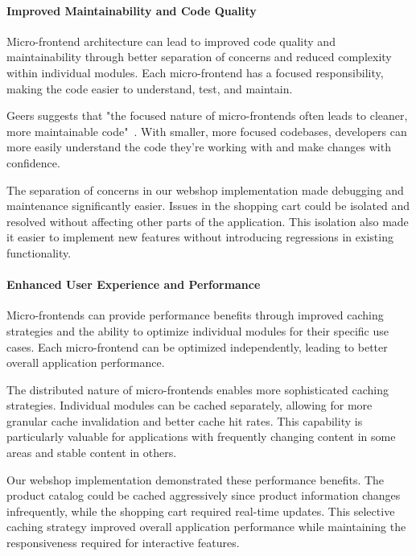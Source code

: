 \documentclass[12pt,a4paper]{report}
\begin{document}
\paragraph{Improved Maintainability and Code Quality}

Micro-frontend architecture can lead to improved code quality and maintainability through better separation of concerns and reduced complexity within individual modules. Each micro-frontend has a focused responsibility, making the code easier to understand, test, and maintain.

Geers suggests that "the focused nature of micro-frontends often leads to cleaner, more maintainable code"~\cite{geers2019microfrontends}. With smaller, more focused codebases, developers can more easily understand the code they're working with and make changes with confidence.

The separation of concerns in our webshop implementation made debugging and maintenance significantly easier. Issues in the shopping cart could be isolated and resolved without affecting other parts of the application. This isolation also made it easier to implement new features without introducing regressions in existing functionality.

\paragraph{Enhanced User Experience and Performance}

Micro-frontends can provide performance benefits through improved caching strategies and the ability to optimize individual modules for their specific use cases. Each micro-frontend can be optimized independently, leading to better overall application performance.

The distributed nature of micro-frontends enables more sophisticated caching strategies. Individual modules can be cached separately, allowing for more granular cache invalidation and better cache hit rates. This capability is particularly valuable for applications with frequently changing content in some areas and stable content in others.

Our webshop implementation demonstrated these performance benefits. The product catalog could be cached aggressively since product information changes infrequently, while the shopping cart required real-time updates. This selective caching strategy improved overall application performance while maintaining the responsiveness required for interactive features.
\end{document}
